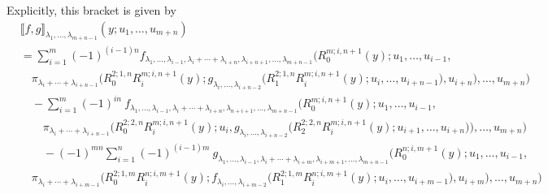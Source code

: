 \documentclass[a4paper,reqno,10pt]{amsart}
\theoremstyle{plain}
\theoremstyle{definition}
\theoremstyle{remark}
\newcommand{\la}{\lambda}
\begin{document}
Explicitly, this bracket is given by
\begin{align} \label{equation x}
 &{\llbracket f, g \rrbracket}_{\la_{1}, \ldots ,\la_{m+n-1}} \left(y ; u_{1}, \ldots, u_{m+n} \right) \nonumber \\
& = \sum_{i=1}^{m}(-1)^{(i-1) n} f_{\la_{1}, \ldots , \la_{i-1}, \la_{i} +\cdots +\la_{i+n}, \la_{i+n+1}, \ldots, \la_{m+n-1}} \big( R_{0}^{m ; i, n+1}(y) ; u_{1}, \ldots, u_{i-1}, \nonumber \\
& \quad \pi_{\la_{i}+\cdots +\la_{i+n-1}}\big(R_{0}^{2 ; 1, n} R_{i}^{m; i, n+1}(y) ; g_{\la_{i}, \ldots, \la_{i+n-2}}\big(R_{1}^{2 ; 1, n} R_{i}^{m ; i, n+1}(y) ; u_{i}, \ldots, u_{i+n-1}\big), u_{i+n}\big), \ldots, u_{m+n} \big)  \nonumber \\
& \quad -\sum_{i=1}^{m}(-1)^{i n} ~ \! f_{\la_{1}, \ldots , \la_{i-1}, \la_{i} +\cdots +\la_{i+n}, \la_{n+i+1}, \ldots, \la_{m+n-1}} \big(R_{0}^{m ; i, n+1}(y) ; u_{1}, \ldots, u_{i-1},  \nonumber\\
& \quad \quad \pi_{\la_{i}+ \cdots +\la_{i+n-1}} \big(R_{0}^{2 ; 2, n} R_{i}^{m ; i, n+1}(y) ; u_{i}, g_{\la_{i}, \ldots ,\la_{i+n-2}} \big(R_{2}^{2 ; 2, n} R_{i}^{m ; i, n+1}(y) ; u_{i+1}, \ldots, u_{i+n}\big)\big),\ldots, u_{m+n}\big) \nonumber \\
&\quad \quad -(-1)^{m n} \sum_{i=1}^{n}(-1)^{(i-1) m} ~ \! g_{\la_{1}, \ldots , \la_{i-1},\la_{i}+\cdots+\la_{i+m},\la_{i+m+1}, \ldots ,\la_{m+n-1}} \big(R_{0}^{n ; i, m+1}(y) ; u_{1}, \ldots, u_{i-1},\nonumber \\
& \quad \pi_{\la_{i}+\cdots+\la_{i+m-1}} \big(R_{0}^{2 ; 1, m} R_{i}^{n ; i, m+1}(y) ; f_{\la_{i}, \ldots ,\la_{i+m-2}} \big(R_{1}^{2 ; 1, m} R_{i}^{n ; i, m+1}(y) ; u_{i}, \ldots, u_{i+m-1}\big), u_{i+m} \big), \ldots, u_{m+n} \big) \nonumber \\

\end{align}
\end{document}
